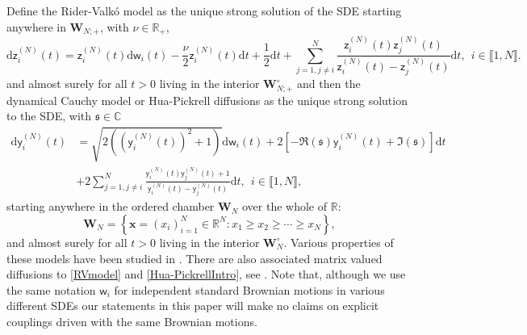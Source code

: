 \documentclass[]{article}
\begin{document}
Define the Rider-Valk\'{o} model \cite{RiderValko,GrabschTexier,MatrixKesten} as the unique strong solution of the SDE starting anywhere in $\mathbf{W}_{N;+}$, with $\nu \in \mathbb{R}_+$,
\begin{equation}\label{RVmodel}
 \mathrm{d}\mathsf{z}_i^{(N)}(t) = \mathsf{z}_i^{(N)}(t) \mathrm{d}\mathsf{w}_i(t) -\frac{\nu}{2}\mathsf{z}_i^{(N)}(t)\mathrm{d}t+\frac{1}{2}\mathrm{d}t+\sum_{j=1,j\neq i}^N\frac{\mathsf{z}_i^{(N)}(t)\mathsf{z}^{(N)}_j(t)}{\mathsf{z}^{(N)}_i(t)-\mathsf{z}^{(N)}_j(t)}\mathrm{d}t, \ \  i\in \llbracket 1, N \rrbracket.   
\end{equation}
and almost surely for all $t>0$ living in the interior $\mathbf{W}_{N;+}^\circ$ and then the dynamical Cauchy model or Hua-Pickrell diffusions \cite{HuaPickrellDiffusions, AM24,AristaDemni,AuerVoit} as the unique strong solution to the SDE,  with $\mathfrak{s}\in \mathbb{C}$
\begin{align}\label{Hua-PickrellIntro}
\mathrm{d}\mathsf{y}_i^{(N)}(t)&=\sqrt{2\left((\mathsf{y}_i^{(N)}(t))^2+1\right)}\mathrm{d}\mathsf{w}_i(t)+2\left[-\Re(\mathfrak{s})\mathsf{y}_i^{(N)}(t)+\Im(\mathfrak{s})\right]\mathrm{d}t\nonumber\\
&+2\sum_{j=1,j\neq i}^N \frac{\mathsf{y}_i^{(N)}(t)\mathsf{y}_j^{(N)}(t)+1}{\mathsf{y}_i^{(N)}(t)-\mathsf{y}_j^{(N)}(t)}\mathrm{d}t, \ \ i\in \llbracket 1, N \rrbracket,
\end{align}
starting anywhere in the ordered chamber $\mathbf{W}_N$ over the whole of $\mathbb{R}$:
\begin{equation*}
\mathbf{W}_N=\left\{\mathbf{x}=(x_i)_{i=1}^N\in \mathbb{R}^N:x_1\ge x_2 \ge \cdots \ge x_N\right\},
\end{equation*}
and almost surely for all $t>0$ living in the interior $\mathbf{W}_N^\circ$. Various properties of these models have been studied in \cite{AM24,HuaPickrellDiffusions, AristaDemni,AuerVoit,RiderValko}. There are also associated matrix valued diffusions to \eqref{RVmodel} and \eqref{Hua-PickrellIntro}, see \cite{HuaPickrellDiffusions,AM24,MatrixBougerol}. Note that, although we use the same notation $\mathsf{w}_i$ for independent standard Brownian motions in various different SDEs our statements in this paper will make no claims on explicit couplings driven with the same Brownian motions. 
\end{document}
